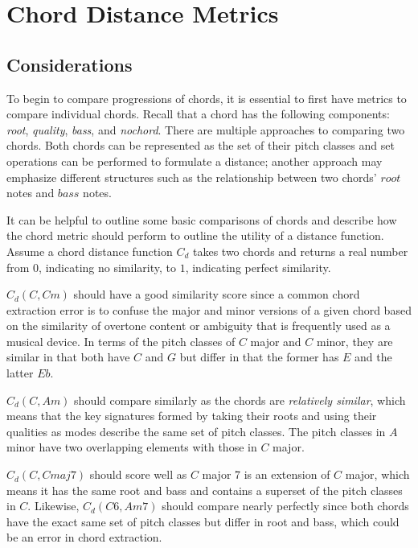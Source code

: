 \section{Chord Distance Metrics} \label{chordmet}

\subsection{Considerations}

To begin to compare progressions of chords, it is essential to first have metrics to compare individual chords. Recall that a chord has the following components: \textit{root}, \textit{quality}, \textit{bass}, and \textit{nochord}. There are multiple approaches to comparing two chords. Both chords can be represented as the set of their pitch classes and set operations can be performed to formulate a distance; another approach may emphasize different structures such as the relationship between two chords' $root$ notes and $bass$ notes.

It can be helpful to outline some basic comparisons of chords and describe how the chord metric should perform to outline the utility of a distance function. Assume a chord distance function $C_d$ takes two chords and returns a real number from $0$, indicating no similarity, to $1$, indicating perfect similarity.

$C_d(C,Cm)$ should have a good similarity score since a common chord extraction error is to confuse the major and minor versions of a given chord based on the similarity of overtone content or ambiguity that is frequently used as a musical device. In terms of the pitch classes of $C$ major and $C$ minor, they are similar in that both have $C$ and $G$ but differ in that the former has $E$ and the latter $Eb$.

$C_d(C,Am)$ should compare similarly as the chords are \textit{relatively similar}, which means that the key signatures formed by taking their roots and using their qualities as modes describe the same set of pitch classes. The pitch classes in $A$ minor have two overlapping elements with those in $C$ major.

$C_d(C,Cmaj7)$ should score well as $C$ major 7 is an extension of $C$ major, which means it has the same root and bass and contains a superset of the pitch classes in $C$. Likewise, $C_d(C6, Am7)$ should compare nearly perfectly since both chords have the exact same set of pitch classes but differ in root and bass, which could be an error in chord extraction.

